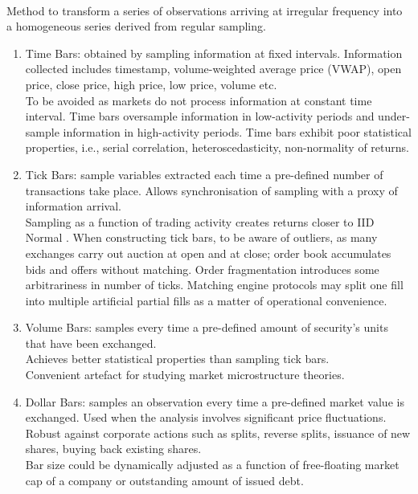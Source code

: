 \documentclass[a4paper,oneside,openany]{book}
\begin{document}
\begin{remark} \\
Method to transform a series of observations arriving at irregular frequency into a homogeneous series derived from regular sampling.
\begin{enumerate}[label=\roman*.]
\setlength{\itemsep}{0pt}
\item Time Bars: obtained by sampling information at fixed intervals. Information collected includes timestamp, volume-weighted average price (VWAP), open price, close price, high price, low price, volume etc.\\
To be avoided as markets do not process information at constant time interval. Time bars oversample information in low-activity periods and under-sample information in high-activity periods. Time bars exhibit poor statistical properties, i.e., serial correlation, heteroscedasticity, non-normality of returns.
\item Tick Bars: sample variables extracted each time a pre-defined number of transactions take place. Allows synchronisation of sampling with a proxy of information arrival.\\
Sampling as a function of trading activity creates returns closer to IID Normal \citep{ane-geman-2000}. When constructing tick bars, to be aware of outliers, as many exchanges carry out auction at open and at close; order book accumulates bids and offers without matching. Order fragmentation introduces some arbitrariness in number of ticks. Matching engine protocols may split one fill into multiple artificial partial fills as a matter of operational convenience.
\item Volume Bars: samples every time a pre-defined amount of security's units that have been exchanged.\\
Achieves better statistical properties than sampling tick bars.\\
Convenient artefact for studying market microstructure theories.
\item Dollar Bars: samples an observation every time a pre-defined market value is exchanged. Used when the analysis involves significant price fluctuations. Robust against corporate actions such as splits, reverse splits, issuance of new shares, buying back existing shares.\\
Bar size could be dynamically adjusted as a function of free-floating market cap of a company or outstanding amount of issued debt.
\end{enumerate}
\end{remark}
\end{document}
